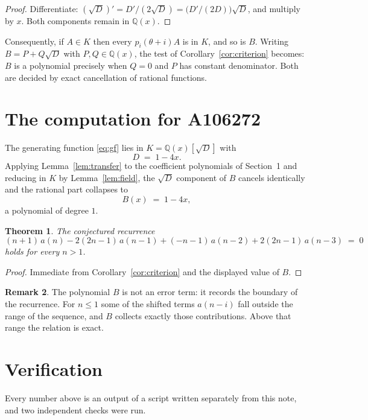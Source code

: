 \documentclass[11pt,a4paper]{article}
\theoremstyle{plain}
\newtheorem{theorem}{Theorem}
\theoremstyle{definition}
\newtheorem{remark}[theorem]{Remark}
\begin{document}
\begin{proof}
Differentiate: $(\sqrt{D})'=D'/(2\sqrt{D})=\bigl(D'/(2D)\bigr)\sqrt{D}$, and multiply by
$x$. Both components remain in $\mathbb{Q}(x)$.
\end{proof}

Consequently, if $A\in K$ then every $p_{i}(\theta+i)A$ is in $K$, and so is $B$. Writing
$B=P+Q\sqrt{D}$ with $P,Q\in\mathbb{Q}(x)$, the test of Corollary~\ref{cor:criterion}
becomes: $B$ is a polynomial precisely when $Q=0$ and $P$ has constant denominator. Both
are decided by exact cancellation of rational functions.

\section{The computation for A106272}

The generating function \eqref{eq:gf} lies in $K=\mathbb{Q}(x)[\sqrt{D}]$ with
\[
D \;=\; 1 - 4 x .
\]
Applying Lemma~\ref{lem:transfer} to the coefficient polynomials of Section~1 and reducing
in $K$ by Lemma~\ref{lem:field}, the $\sqrt{D}$ component of $B$ cancels identically and
the rational part collapses to
\[
B(x)\;=\;1 - 4 x ,
\]
a polynomial of degree $1$.

\begin{theorem}
The conjectured recurrence
\[
(n + 1)\,a(n) -  2 \left(2 n - 1\right)\,a(n-1) + (- n - 1)\,a(n-2) + 2 \left(2 n - 1\right)\,a(n-3) \;=\;0
\]
holds for every $n>1$.
\end{theorem}

\begin{proof}
Immediate from Corollary~\ref{cor:criterion} and the displayed value of $B$.
\end{proof}

\begin{remark}
The polynomial $B$ is not an error term: it records the boundary of the recurrence. For
$n\le1$ some of the shifted terms $a(n-i)$ fall outside the range of the sequence,
and $B$ collects exactly those contributions. Above that range the relation is exact.
\end{remark}

\section{Verification}

Every number above is an output of a script written separately from this note, and two
independent checks were run.
\end{document}
